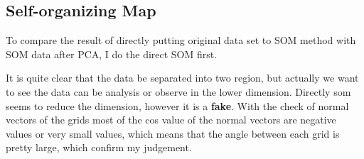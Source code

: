\documentclass[titlepage,a4paper,12pt,thmsb]{report}
\begin{document}
\newpage
\begin{center}
\begin{figure}[h]
{\par}
\end{figure}
{}
\end{center}

\begin{center}
\begin{figure}[h]
{\par}
\end{figure}
{}
\end{center}
\newpage
\begin{center}
\begin{figure}[h]
{\par}
\end{figure}
{}
\end{center}
\newpage


\subsection{Self-organizing Map}

To compare the result of directly putting original data set to SOM method with SOM data after PCA, I do the direct SOM first.

It is quite clear that the data be separated into two region, but actually we want to see the data can be analysis or observe in the lower dimension.  Directly som seems to reduce the dimension, however it is a {\bf fake}.  With the check of  normal vectors of the grids most of the cos value of the normal vectors are negative values or very small values, which means that the angle between each grid is pretty large, which confirm my judgement.


\begin{center}
\begin{figure}[h]
{\par}
\end{figure}
{}
\end{center}
\end{document}
